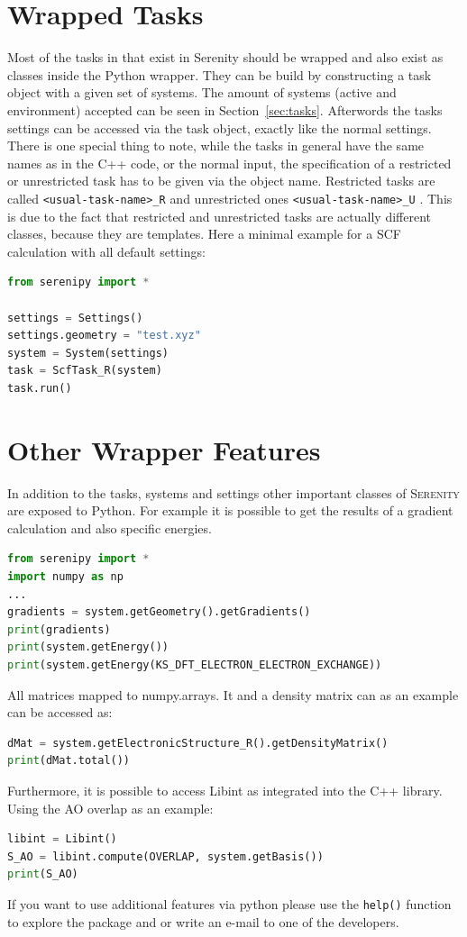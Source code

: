 \documentclass[bibliography=totocnumbered,a4paper,10pt,oneside]{scrbook}
\newcommand{
\serenity}{\textsc{Serenity}\xspace}
\newcommand{\ttt}[1]{%
  \begingroup\setlength{\fboxsep}{1pt}%
  \colorbox{serenity-green!30}{\texttt{\hspace*{2pt}\vphantom{(g}#1\hspace*{2pt}}}%
  \endgroup
}
\begin{document}
\section{Wrapped Tasks}
Most of the tasks in that exist in Serenity should be wrapped and also exist as classes inside the Python wrapper.
They can be build by constructing a task object with a given set of systems.
The amount of systems (active and environment) accepted can be seen in Section~\ref{sec:tasks}.
Afterwords the tasks settings can be accessed via the task object, exactly like the normal settings.
There is one special thing to note, while the tasks in general have the same names as in the C++ code, or the
normal input, the specification of a restricted or unrestricted task has to be given via the object name.
Restricted tasks are called \ttt{<usual-task-name>\_R} and unrestricted ones \ttt{<usual-task-name>\_U}.
This is due to the fact that restricted and unrestricted tasks are actually different classes, because they are templates.
Here a minimal example for a SCF calculation with all default settings:
\begin{lstlisting}[language=Python]
from serenipy import *

settings = Settings()
settings.geometry = "test.xyz"
system = System(settings)
task = ScfTask_R(system)
task.run()
\end{lstlisting}
\section{Other Wrapper Features}
In addition to the tasks, systems and settings other important classes of \serenity are exposed to Python.
For example it is possible to get the results of a gradient calculation and also specific energies.
\begin{lstlisting}[language=Python]
from serenipy import *
import numpy as np
...
gradients = system.getGeometry().getGradients()
print(gradients)
print(system.getEnergy())
print(system.getEnergy(KS_DFT_ELECTRON_ELECTRON_EXCHANGE))
\end{lstlisting}
All matrices mapped to numpy.arrays.
It and a density matrix can as an example can be accessed as:
\begin{lstlisting}[language=Python]
dMat = system.getElectronicStructure_R().getDensityMatrix()
print(dMat.total())
\end{lstlisting}
Furthermore, it is possible to access Libint as integrated into the C++ library.
Using the AO overlap as an example:
\begin{lstlisting}[language=Python]
libint = Libint()
S_AO = libint.compute(OVERLAP, system.getBasis())
print(S_AO)
\end{lstlisting}
If you want to use additional features via python please use the \ttt{help()} function to explore the package
and or write an e-mail to one of the developers.
\end{document}
